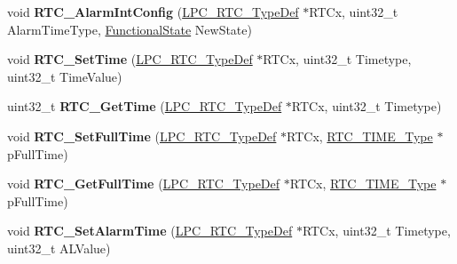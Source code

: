 \begin{DoxyCompactItemize}
\item 
\hypertarget{group___r_t_c___public___functions_ga1d95697fba79b99aaff510762cf4e34b}{void {\bfseries \-R\-T\-C\-\_\-\-Alarm\-Int\-Config} (\hyperlink{struct_l_p_c___r_t_c___type_def}{\-L\-P\-C\-\_\-\-R\-T\-C\-\_\-\-Type\-Def} $\ast$\-R\-T\-Cx, uint32\-\_\-t \-Alarm\-Time\-Type, \hyperlink{group___l_p_c___types___public___types_gac9a7e9a35d2513ec15c3b537aaa4fba1}{\-Functional\-State} \-New\-State)}\label{group___r_t_c___public___functions_ga1d95697fba79b99aaff510762cf4e34b}

\item 
\hypertarget{group___r_t_c___public___functions_ga93a5d95e2067f0523508e7a950f31c41}{void {\bfseries \-R\-T\-C\-\_\-\-Set\-Time} (\hyperlink{struct_l_p_c___r_t_c___type_def}{\-L\-P\-C\-\_\-\-R\-T\-C\-\_\-\-Type\-Def} $\ast$\-R\-T\-Cx, uint32\-\_\-t \-Timetype, uint32\-\_\-t \-Time\-Value)}\label{group___r_t_c___public___functions_ga93a5d95e2067f0523508e7a950f31c41}

\item 
\hypertarget{group___r_t_c___public___functions_gaa4d82b14fcbd801c830b98fd5210265b}{uint32\-\_\-t {\bfseries \-R\-T\-C\-\_\-\-Get\-Time} (\hyperlink{struct_l_p_c___r_t_c___type_def}{\-L\-P\-C\-\_\-\-R\-T\-C\-\_\-\-Type\-Def} $\ast$\-R\-T\-Cx, uint32\-\_\-t \-Timetype)}\label{group___r_t_c___public___functions_gaa4d82b14fcbd801c830b98fd5210265b}

\item 
\hypertarget{group___r_t_c___public___functions_ga30c20ca8068474ca6a3e25ab4aef9664}{void {\bfseries \-R\-T\-C\-\_\-\-Set\-Full\-Time} (\hyperlink{struct_l_p_c___r_t_c___type_def}{\-L\-P\-C\-\_\-\-R\-T\-C\-\_\-\-Type\-Def} $\ast$\-R\-T\-Cx, \hyperlink{struct_r_t_c___t_i_m_e___type}{\-R\-T\-C\-\_\-\-T\-I\-M\-E\-\_\-\-Type} $\ast$p\-Full\-Time)}\label{group___r_t_c___public___functions_ga30c20ca8068474ca6a3e25ab4aef9664}

\item 
\hypertarget{group___r_t_c___public___functions_gae971f6565876e521803a7e000281fe8c}{void {\bfseries \-R\-T\-C\-\_\-\-Get\-Full\-Time} (\hyperlink{struct_l_p_c___r_t_c___type_def}{\-L\-P\-C\-\_\-\-R\-T\-C\-\_\-\-Type\-Def} $\ast$\-R\-T\-Cx, \hyperlink{struct_r_t_c___t_i_m_e___type}{\-R\-T\-C\-\_\-\-T\-I\-M\-E\-\_\-\-Type} $\ast$p\-Full\-Time)}\label{group___r_t_c___public___functions_gae971f6565876e521803a7e000281fe8c}

\item 
\hypertarget{group___r_t_c___public___functions_ga89c822fc196b087711f38bc57b4f9212}{void {\bfseries \-R\-T\-C\-\_\-\-Set\-Alarm\-Time} (\hyperlink{struct_l_p_c___r_t_c___type_def}{\-L\-P\-C\-\_\-\-R\-T\-C\-\_\-\-Type\-Def} $\ast$\-R\-T\-Cx, uint32\-\_\-t \-Timetype, uint32\-\_\-t \-A\-L\-Value)}\label{group___r_t_c___public___functions_ga89c822fc196b087711f38bc57b4f9212}


\end{DoxyCompactItemize}

